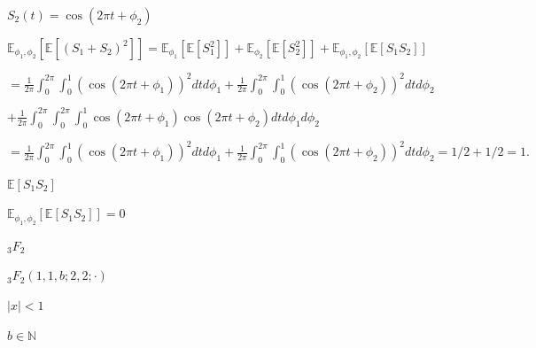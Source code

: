 \documentclass{article}
\def\lthtmlcheckvsize{\ifdim\ht\sizebox<\vsize 
  \ifdim\wd\sizebox<\hsize\expandafter\hfill\fi \expandafter\vfill
  \else\expandafter\vss\fi}%
\begin{document}
{\newpage\clearpage
{}%
$ S_2(t) = \cos(2 \pi t + \phi_2)$%
\lthtmlindisplaymathZ
\lthtmlcheckvsize\clearpage}

{\newpage\clearpage
{}%
$\displaystyle \mathbb{E}_{\phi_1,\phi_2} \left[\mathbb{E}[(S_1 + S_2)^2]\right] = \mathbb{E}_{\phi_1} \left[\mathbb{E}\left[ S_1^2\right]\right] + \mathbb{E}_{\phi_2} \left[\mathbb{E}\left[ S_2^2\right]\right] +\mathbb{E}_{\phi_1,\phi_2} \left[\mathbb{E}\left[ S_1S_2\right]\right]$%
\lthtmlindisplaymathZ
\lthtmlcheckvsize\clearpage}

{\newpage\clearpage
{}%
$\displaystyle =\frac{1}{2 \pi}\int_0^{2 \pi} \int_0^1 (\cos(2 \pi t + \phi_1))^2dt d \phi_1 + \frac{1}{2 \pi}\int_0^{2 \pi} \int_0^1 ( \cos(2 \pi t + \phi_2))^2dt  d \phi_2$%
\lthtmlindisplaymathZ
\lthtmlcheckvsize\clearpage}

{\newpage\clearpage
{}%
$\displaystyle + \frac{1}{2 \pi}\int_0^{2 \pi} \int_0^{2 \pi}\int_0^1 \cos(2 \pi t + \phi_1) \cos(2 \pi t + \phi_2)dt d \phi_1 d \phi_2$%
\lthtmlindisplaymathZ
\lthtmlcheckvsize\clearpage}

{\newpage\clearpage
{}%
$\displaystyle = \frac{1}{2 \pi}\int_0^{2 \pi} \int_0^1 (\cos(2 \pi t + \phi_1))^2dt d \phi_1  + \frac{1}{2 \pi}\int_0^{2 \pi} \int_0^1 ( \cos(2 \pi t + \phi_2))^2dt  d \phi_2 = 1/2 +1/2 =1.$%
\lthtmlindisplaymathZ
\lthtmlcheckvsize\clearpage}

{\newpage\clearpage
{}%
$ \mathbb{E}[S_1 S_2]$%
\lthtmlindisplaymathZ
\lthtmlcheckvsize\clearpage}

{\newpage\clearpage
{}%
$ \mathbb{E}_{\phi_1,\phi_2} \left[\mathbb{E}\left[ S_1S_2\right]\right] =0$%
\lthtmlindisplaymathZ
\lthtmlcheckvsize\clearpage}

{\newpage\clearpage
{}%
$ _3F_2$%
\lthtmlindisplaymathZ
\lthtmlcheckvsize\clearpage}

{\newpage\clearpage
{}%
$ _3F_2(1,1,b;2,2;\cdot)$%
\lthtmlindisplaymathZ
\lthtmlcheckvsize\clearpage}

{\newpage\clearpage
{}%
$ |x|<1$%
\lthtmlindisplaymathZ
\lthtmlcheckvsize\clearpage}

{\newpage\clearpage
{}%
$ b\in\mathbb{N}$%
\lthtmlindisplaymathZ
\lthtmlcheckvsize\clearpage}
\end{document}
